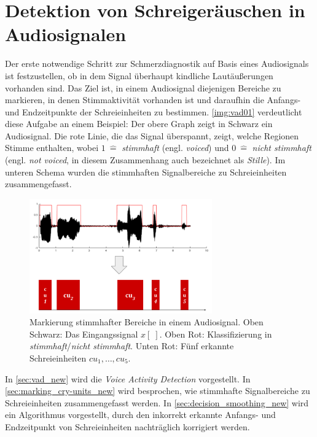 \chapter{Detektion von Schreigeräuschen in Audiosignalen}
\label{sec:vad}

Der erste notwendige Schritt zur Schmerzdiagnostik auf Basis eines Audiosignals ist festzustellen, ob in dem Signal überhaupt kindliche Lautäußerungen vorhanden sind. Das Ziel ist, in einem Audiosignal diejenigen Bereiche zu markieren, in denen Stimmaktivität vorhanden ist und daraufhin die Anfangs- und Endzeitpunkte  der Schreieinheiten zu bestimmen. \autoref{img:vad01} verdeutlicht diese Aufgabe an einem Beispiel: Der obere Graph zeigt in Schwarz ein Audiosignal. Die rote Linie, die das Signal überspannt, zeigt, welche Regionen Stimme enthalten, wobei $1 \: \hat{=} $ \emph{stimmhaft} (engl. \emph{voiced}) und $0 \: \hat{=}  $ \emph{nicht stimmhaft} (engl. \emph{not voiced}, in diesem Zusammenhang auch bezeichnet als \emph{Stille}). Im unteren Schema wurden die stimmhaften Signalbereiche zu Schreieinheiten zusammengefasst.

\begin{figure}[h]
	\centering
	\includegraphics[width=0.7\textwidth]{bilder/vad_introduction02.png}
	\caption[Markierung stimmhafter Bereiche in einem Audiosignal]{Markierung stimmhafter Bereiche in einem Audiosignal. Oben Schwarz: Das Eingangssignal $x[\;]$. Oben Rot: Klassifizierung in \emph{stimmhaft}/\emph{nicht stimmhaft}. Unten Rot: Fünf erkannte Schreieinheiten $cu_1 , \ldots , cu_5$.}
	\label{img:vad01}
\end{figure}

In \autoref{sec:vad_new} wird die \emph{Voice Activity Detection} vorgestellt. In \autoref{sec:marking_cry-units_new} wird besprochen, wie stimmhafte Signalbereiche zu Schreieinheiten zusammengefasst werden. In \autoref{sec:decision_smoothing_new} wird ein Algorithmus vorgestellt, durch den inkorrekt erkannte Anfangs- und Endzeitpunkt von Schreieinheiten nachträglich korrigiert werden.

